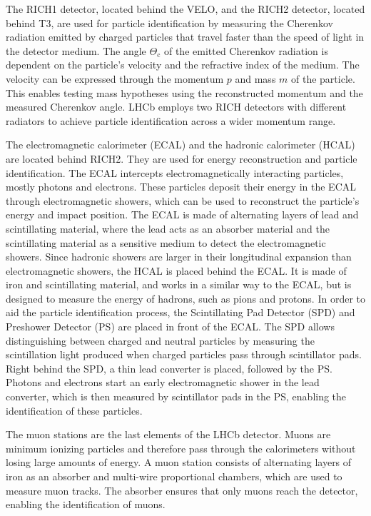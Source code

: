 The RICH1 detector, located behind the VELO, and the RICH2 detector, located behind T3, are used for particle identification by measuring the Cherenkov radiation emitted by charged particles that travel faster than the speed of light in the detector medium. The angle $\Theta_{\text{c}}$ of the emitted Cherenkov radiation is dependent on the particle's velocity and the refractive index of the medium. The velocity can be expressed through the momentum $p$ and mass $m$ of the particle. This enables testing mass hypotheses using the reconstructed momentum and the measured Cherenkov angle. LHCb employs
two RICH detectors with different radiators to achieve particle identification across a wider momentum range.

The electromagnetic calorimeter (ECAL) and the hadronic calorimeter (HCAL) are located behind RICH2. They are used for energy reconstruction and particle identification. The ECAL intercepts electromagnetically interacting particles, mostly photons and electrons. These particles deposit their energy in the ECAL through electromagnetic showers, which can be used to reconstruct the particle's energy and impact position. The ECAL is made of alternating layers of lead and scintillating material, where the lead acts as an absorber material and the scintillating material as a sensitive medium to detect the electromagnetic showers. Since hadronic showers are larger in their longitudinal expansion than electromagnetic showers, the HCAL is placed behind the ECAL. It is made of iron and scintillating material, and works in a similar way to the ECAL, but is designed to measure the energy of hadrons, such as  pions and protons. In order to aid the particle identification process, the Scintillating Pad Detector (SPD) and Preshower Detector (PS) are placed in front of the ECAL. The SPD allows distinguishing between charged and neutral particles by measuring the scintillation light produced when charged particles pass through scintillator pads. Right behind the SPD, a thin lead converter is placed, followed by the PS. Photons and electrons start an early electromagnetic shower in the lead converter, which is then measured by scintillator pads in the PS, enabling the identification of these particles. 

The muon stations are the last elements of the LHCb detector. Muons are minimum ionizing particles and therefore pass through the calorimeters without losing large amounts of energy. A muon station consists of alternating layers of iron as an absorber and multi-wire proportional chambers, which are used to measure muon tracks. The absorber ensures that only muons reach the detector, enabling the identification of muons.

